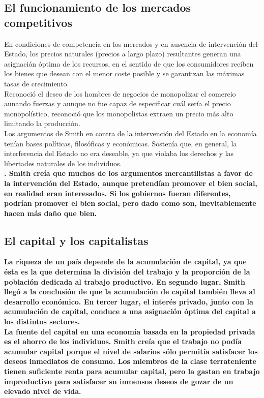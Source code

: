 \documentclass[10pt]{book}
\begin{document}
\subsection*{El funcionamiento de los mercados competitivos}
En condiciones de competencia en los mercados y en ausencia de intervención del Estado, los precios naturales (precios a largo plazo) resultantes generan una asignación óptima de los recursos, en el sentido de que los consumidores reciben los bienes que desean con el menor coste posible y se garantizan las máximas tasas de crecimiento.\\
Reconoció el deseo de los hombres de negocios de monopolizar el comercio aunando fuerzas y aunque no fue capaz de especificar cuál sería el precio monopolístico, reconoció que los monopolistas extraen un precio más alto limitando la producción. \\
Los argumentos de Smith en contra de la intervención del Estado en la economía tenían bases políticas, filosóficas y económicas. Sostenía que, en general, la interferencia del Estado no era deseable, ya que violaba los derechos y las libertades naturales de los individuos.\\ 
\textbf{. Smith creía que muchos de los argumentos mercantilistas a favor de la intervención del Estado, aunque pretendían promover el bien social, en realidad eran interesados. Si los gobiernos fueran diferentes, podrían promover el bien social, pero dado como son, inevitablemente hacen más daño que bien.}

\subsection*{El capital y los capitalistas}
\textbf{La riqueza de un país depende de la acumulación de capital, ya que ésta es la que determina la división del trabajo y la proporción de la población dedicada al trabajo productivo. En segundo lugar, Smith llegó a la conclusión de que la acumulación de capital también lleva al desarrollo económico. En tercer lugar, el interés privado, junto con la acumulación de capital, conduce a una asignación óptima del capital a los distintos sectores.\\
La fuente del capital en una economía basada en la propiedad privada es el ahorro de los individuos. Smith creía que el trabajo no podía acumular capital porque el nivel de salarios sólo permitía satisfacer los deseos inmediatos de consumo. Los miembros de la clase terrateniente tienen suficiente renta para acumular capital, pero la gastan en trabajo improductivo para satisfacer su inmensos deseos de gozar de un elevado nivel de vida.}\\
\end{document}
